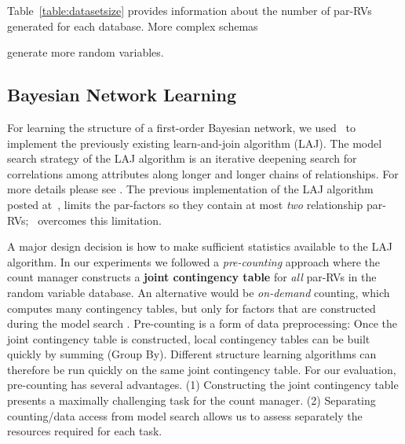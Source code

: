 \documentclass{IEEEtran}
\begin{document}
Table~\ref{table:datasetsize} provides information about the number of par-RVs generated for each database. More complex schemas 

generate more random variables. 





\subsection{Bayesian Network Learning} 
For learning the structure of a first-order Bayesian network, we used \FB\ to implement the previously existing learn-and-join algorithm (LAJ). 
The model search strategy of the LAJ algorithm is an iterative deepening search for correlations among attributes along longer and longer chains of relationships. For more details please see \cite{Schulte2012}. 
The previous implementation of the LAJ algorithm posted at~\cite{bib:bbsite}, limits the par-factors so they contain at most {\em two} relationship par-RVs; \FB\ overcomes this limitation.

A major design decision is how to make sufficient statistics available to the LAJ algorithm. In our experiments we followed a {\em pre-counting} approach where the count manager constructs a \textbf{joint contingency table} for {\em all} par-RVs in the random variable database. An alternative would be {\em on-demand} counting, which computes many contingency tables, but only for factors that are constructed during the model search \cite{Lv2012}.
Pre-counting is a form of data preprocessing: Once the joint contingency table is constructed, local contingency tables can be built quickly by summing (Group By). Different structure learning algorithms can therefore be run quickly on the same joint contingency table. 
For our evaluation, pre-counting has several advantages. (1) Constructing the joint contingency table presents a maximally challenging task for the count manager. (2) Separating counting/data access from model search allows us to assess separately the resources required for each task.
\end{document}
